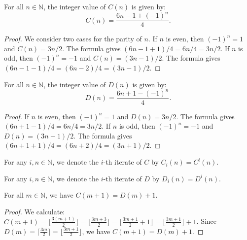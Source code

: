 \begin{lemma}
  \label{lemma:C_formula}
  \leanok
  For all $n \in \mathbb{N}$, the integer value of $C(n)$ is given by:
  \[ C(n) = \frac{6n - 1 + (-1)^n}{4}. \]
  \begin{proof}
    \leanok
    We consider two cases for the parity of $n$.
    If $n$ is even, then $(-1)^n = 1$ and $C(n) = 3n/2$. The formula gives $(6n-1+1)/4 = 6n/4 = 3n/2$.
    If $n$ is odd, then $(-1)^n = -1$ and $C(n) = (3n-1)/2$. The formula gives $(6n-1-1)/4 = (6n-2)/4 = (3n-1)/2$.
  \end{proof}
\end{lemma}

\begin{lemma}
  \label{lemma:D_formula}
  \leanok
  For all $n \in \mathbb{N}$, the integer value of $D(n)$ is given by:
  \[ D(n) = \frac{6n + 1 - (-1)^n}{4}. \]
  \begin{proof}
    \leanok
    If $n$ is even, then $(-1)^n = 1$ and $D(n) = 3n/2$. The formula gives $(6n+1-1)/4 = 6n/4 = 3n/2$.
    If $n$ is odd, then $(-1)^n = -1$ and $D(n) = (3n+1)/2$. The formula gives $(6n+1+1)/4 = (6n+2)/4 = (3n+1)/2$.
  \end{proof}
\end{lemma}

\begin{definition}
  \label{def:Citer}
  \leanok
  For any $i, n \in \mathbb{N}$, we denote the $i$-th iterate of $C$ by $C_i(n) = C^i(n)$.
\end{definition}

\begin{definition}
  \label{def:Diter}
  \leanok
  For any $i, n \in \mathbb{N}$, we denote the $i$-th iterate of $D$ by $D_i(n) = D^i(n)$.
\end{definition}

\begin{lemma}
  \label{lemma:C_succ_eq_D_succ}
  \leanok
  For all $m \in \mathbb{N}$, we have $C(m+1) = D(m) + 1$.
  \begin{proof}
    \leanok
    We calculate:
    $C(m+1) = \lfloor \frac{3(m+1)}{2} \rfloor = \lfloor \frac{3m+3}{2} \rfloor = \lfloor \frac{3m+1}{2} + 1 \rfloor = \lfloor \frac{3m+1}{2} \rfloor + 1$.
    Since $D(m) = \lceil \frac{3m}{2} \rceil = \lfloor \frac{3m+1}{2} \rfloor$, we have $C(m+1) = D(m) + 1$.
  \end{proof}
\end{lemma}


